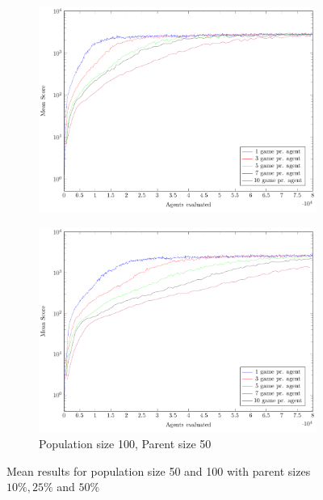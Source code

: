 \begin{figure}
\begin{subfigure}[b]{0.49\textwidth}
        \includegraphics[width=\textwidth]{data/ce_population_offspring/100x_split/constant_l100_o25/mean/PlotFile.pdf}
    \end{subfigure}
    \begin{subfigure}[b]{0.49\textwidth}
    	\caption{Population size 100, Parent size 50}
        \includegraphics[width=\textwidth]{data/ce_population_offspring/100x_split/constant_l100_o50/mean/PlotFile.pdf}
    \end{subfigure}
    
    \caption{Mean results for population size 50 and 100 with parent sizes $10 \% , 25 \%$ and $50 \%$}
\end{figure}

\clearpage

